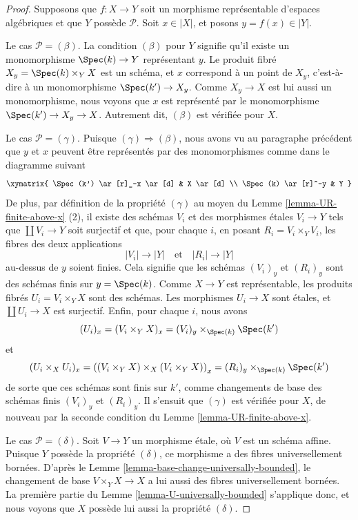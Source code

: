 \begin{proof}
Supposons que $f : X \to Y$ soit un morphisme représentable d'espaces
algébriques et que $Y$ possède $\mathcal{P}$. Soit $x \in |X|$, et posons
$y = f(x) \in |Y|$.

\medskip\noindent
Le cas $\mathcal{P} = (\beta)$. La condition $(\beta)$ pour $Y$ signifie
qu'il existe un monomorphisme $\Spec(k) \to Y$ représentant $y$.
Le produit fibré $X_y = \Spec(k) \times_Y X$ est un schéma, et
$x$ correspond à un point de $X_y$, c'est-à-dire à un monomorphisme
$\Spec(k') \to X_y$. Comme $X_y \to X$ est lui aussi un monomorphisme,
nous voyons que $x$ est représenté par le monomorphisme
$\Spec(k') \to X_y \to X$.
Autrement dit, $(\beta)$ est vérifiée pour $X$.

\medskip\noindent
Le cas $\mathcal{P} = (\gamma)$. Puisque $(\gamma) \Rightarrow (\beta)$,
nous avons vu au paragraphe précédent que $y$ et $x$ peuvent être
représentés par des monomorphismes comme dans le diagramme suivant
$$
\xymatrix{
\Spec(k') \ar[r]_-x \ar[d] & X \ar[d] \\
\Spec(k) \ar[r]^-y & Y
}
$$
De plus, par définition de la propriété $(\gamma)$ au moyen du
Lemme \ref{lemma-UR-finite-above-x} (2),
il existe des schémas $V_i$ et des morphismes étales $V_i \to Y$ tels que
$\coprod V_i \to Y$ soit surjectif et que, pour chaque $i$, en posant
$R_i = V_i \times_Y V_i$, les fibres des deux applications
$$
|V_i| \longrightarrow |Y|
\quad\text{et}\quad
|R_i| \longrightarrow |Y|
$$
au-dessus de $y$ soient finies. Cela signifie que les schémas
$(V_i)_y$ et $(R_i)_y$ sont des schémas finis sur $y = \Spec(k)$.
Comme $X \to Y$ est représentable, les produits fibrés
$U_i = V_i \times_Y X$ sont des schémas. Les morphismes $U_i \to X$
sont étales, et $\coprod U_i \to X$ est surjectif. Enfin, pour chaque $i$,
nous avons
$$
(U_i)_x =
(V_i \times_Y X)_x =
(V_i)_y \times_{\Spec(k)} \Spec(k')
$$
et
$$
(U_i \times_X U_i)_x =
\left((V_i \times_Y X) \times_X (V_i \times_Y X)\right)_x =
(R_i)_y \times_{\Spec(k)} \Spec(k')
$$
de sorte que ces schémas sont finis sur $k'$, comme changements de base des
schémas finis $(V_i)_y$ et $(R_i)_y$. Il s'ensuit que $(\gamma)$ est
vérifiée pour $X$, de nouveau par la seconde condition du
Lemme \ref{lemma-UR-finite-above-x}.

\medskip\noindent
Le cas $\mathcal{P} = (\delta)$. Soit $V \to Y$ un morphisme étale, où
$V$ est un schéma affine. Puisque $Y$ possède la propriété $(\delta)$,
ce morphisme a des fibres universellement bornées. D'après le
Lemme \ref{lemma-base-change-universally-bounded},
le changement de base $V \times_Y X \to X$ a lui aussi des fibres
universellement bornées. La première partie du
Lemme \ref{lemma-U-universally-bounded}
s'applique donc, et nous voyons que $X$ possède lui aussi la propriété
$(\delta)$.


\end{proof}
